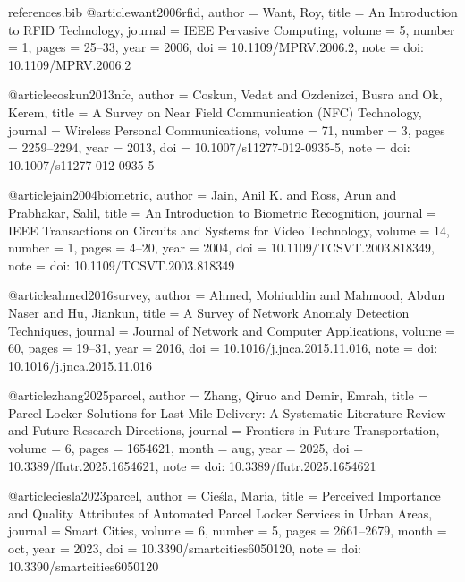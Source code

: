 \begin{filecontents*}[overwrite]{references.bib}
@article{want2006rfid,
  author  = {Want, Roy},
  title   = {An Introduction to {RFID} Technology},
  journal = {IEEE Pervasive Computing},
  volume  = {5},
  number  = {1},
  pages   = {25--33},
  year    = {2006},
  doi     = {10.1109/MPRV.2006.2},
  note    = {doi: 10.1109/MPRV.2006.2}
}

@article{coskun2013nfc,
  author  = {Coskun, Vedat and Ozdenizci, Busra and Ok, Kerem},
  title   = {A Survey on Near Field Communication ({NFC}) Technology},
  journal = {Wireless Personal Communications},
  volume  = {71},
  number  = {3},
  pages   = {2259--2294},
  year    = {2013},
  doi     = {10.1007/s11277-012-0935-5},
  note    = {doi: 10.1007/s11277-012-0935-5}
}

@article{jain2004biometric,
  author  = {Jain, Anil K. and Ross, Arun and Prabhakar, Salil},
  title   = {An Introduction to Biometric Recognition},
  journal = {IEEE Transactions on Circuits and Systems for Video Technology},
  volume  = {14},
  number  = {1},
  pages   = {4--20},
  year    = {2004},
  doi     = {10.1109/TCSVT.2003.818349},
  note    = {doi: 10.1109/TCSVT.2003.818349}
}

@article{ahmed2016survey,
  author  = {Ahmed, Mohiuddin and Mahmood, Abdun Naser and Hu, Jiankun},
  title   = {A Survey of Network Anomaly Detection Techniques},
  journal = {Journal of Network and Computer Applications},
  volume  = {60},
  pages   = {19--31},
  year    = {2016},
  doi     = {10.1016/j.jnca.2015.11.016},
  note    = {doi: 10.1016/j.jnca.2015.11.016}
}


@article{zhang2025parcel,
  author  = {Zhang, Qiruo and Demir, Emrah},
  title   = {Parcel Locker Solutions for Last Mile Delivery: A Systematic Literature Review and Future Research Directions},
  journal = {Frontiers in Future Transportation},
  volume  = {6},
  pages   = {1654621},
  month   = aug,
  year    = {2025},
  doi     = {10.3389/ffutr.2025.1654621},
  note    = {doi: 10.3389/ffutr.2025.1654621}
}

@article{ciesla2023parcel,
  author  = {Cie{\'s}la, Maria},
  title   = {Perceived Importance and Quality Attributes of Automated Parcel Locker Services in Urban Areas},
  journal = {Smart Cities},
  volume  = {6},
  number  = {5},
  pages   = {2661--2679},
  month   = oct,
  year    = {2023},
  doi     = {10.3390/smartcities6050120},
  note    = {doi: 10.3390/smartcities6050120}
}


\end{filecontents*}

